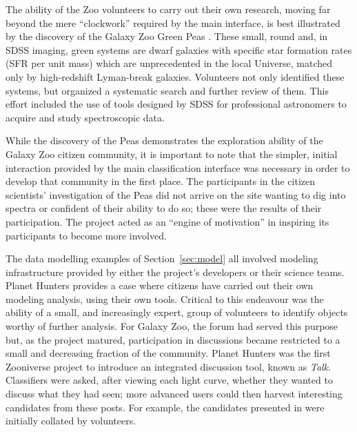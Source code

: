 \documentclass{ar2e}
\def\Sref#1{Section~\ref{#1}\xspace}
\def\CaseStudy#1{\noindent{\it\bf #1 \,\,\,\,}}
\def\Talk{{\it Talk}}
\begin{document}
The ability of the Zoo volunteers to carry out their own research, moving far
beyond the mere ``clockwork'' required by the main interface, is best
illustrated by the discovery of the Galaxy Zoo Green Peas
\citep{Cardamone++2009}. These small, round and, in SDSS imaging, green systems
are dwarf galaxies with specific star formation rates (SFR per unit mass) which
are unprecedented in the local Universe, matched only by high-redshift
Lyman-break galaxies. Volunteers not only identified these systems, but
organized a systematic search and further review of them. This effort included
the use of tools designed by SDSS for professional astronomers to acquire and
study spectroscopic data. 

While the discovery of the Peas demonstrates the exploration ability of the
Galaxy Zoo citizen community, it is important to note that the simpler, initial
interaction provided by the main classification interface was necessary in order
to develop that community in the first place. The participants in the citizen
scientists' investigation of the Peas did not arrive on the site wanting to dig
into spectra or confident of their ability to do so; these were the results of
their participation. The project acted as an ``engine of motivation'' in
inspiring its participants to become more involved. 


\CaseStudy{Lightcurve analysis on Planet Hunters \Talk.}  

The data modelling examples of \Sref{sec:model} all involved modeling
infrastructure provided by either the project's developers or their science
teams. Planet Hunters provides a case where citizens have carried out their own
modeling analysis, using their own tools. Critical to this endeavour was the
ability of a small,  and increasingly expert, group of volunteers to identify
objects worthy of further analysis. For Galaxy Zoo, the forum had served this
purpose but, as the project matured, participation in discussions became
restricted to a small and decreasing fraction of the community. Planet Hunters
was the first Zooniverse project to introduce an integrated discussion tool,
known as \Talk. Classifiers were asked, after viewing each light curve,
whether they wanted to discuss what they had seen; more advanced users could
then harvest interesting candidates from these posts. For example, the
candidates presented in \citet{LintottPH} were initially collated by volunteers.
\end{document}
